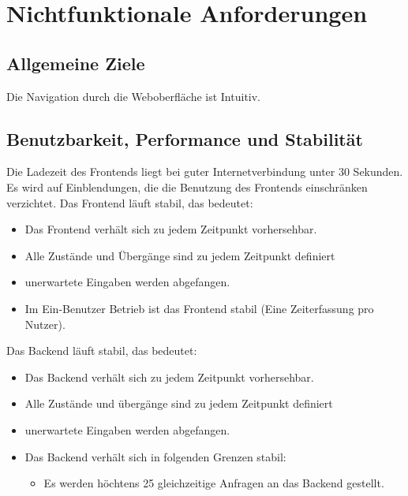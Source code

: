 \section{Nichtfunktionale Anforderungen}

\subsection{Allgemeine Ziele}
\begin{requirements}
     Die Navigation durch die Weboberfläche ist Intuitiv.
\end{requirements}

\subsection{Benutzbarkeit, Performance und Stabilität}
\begin{requirements}
     Die Ladezeit des Frontends liegt bei guter Internetverbindung unter 30 Sekunden.
     Es wird auf Einblendungen, die die Benutzung des Frontends einschränken verzichtet.
     Das Frontend läuft stabil, das bedeutet:
     \begin{itemize}
        \item Das Frontend verhält sich zu jedem Zeitpunkt vorhersehbar.
        \item Alle Zustände und Übergänge sind zu jedem Zeitpunkt definiert
        \item unerwartete Eingaben werden abgefangen.
        \item Im Ein-Benutzer Betrieb ist das Frontend stabil (Eine Zeiterfassung pro Nutzer).
     \end{itemize}
      Das Backend läuft stabil, das bedeutet:
          \begin{itemize}
             \item Das Backend verhält sich zu jedem Zeitpunkt vorhersehbar.
             \item Alle Zustände und übergänge sind zu jedem Zeitpunkt definiert
             \item unerwartete Eingaben werden abgefangen.
             \item Das Backend verhält sich in folgenden Grenzen stabil:
	\begin{itemize}
                    \item Es werden höchtens 25 gleichzeitige Anfragen an das Backend gestellt.
                \end{itemize}
          \end{itemize}
\end{requirements}

